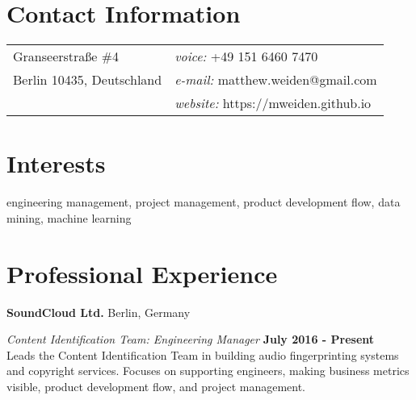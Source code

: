 \documentclass[margin,line]{res}
\newenvironment{list1}{
  \begin{list}{\ding{113}}{%
      \setlength{\itemsep}{0in}
      \setlength{\parsep}{0in} \setlength{\parskip}{0in}
      \setlength{\topsep}{0in} \setlength{\partopsep}{0in}
      \setlength{\leftmargin}{0.17in}}}{\end{list}}
\begin{document}

\begin{resume}
\section{\sc Contact Information}
\vspace{.05in}
\begin{tabular}{@{}p{2in}p{4in}}
Granseerstra{\ss}e \#4             & {\it voice:}  +49 151 6460 7470 \\
Berlin 10435, Deutschland & {\it e-mail:}  matthew.weiden@gmail.com\\
  & {\it website:} https://mweiden.github.io
\end{tabular}

\section{\sc Interests}
engineering management, project management, product development flow, data mining, machine learning

\section{\sc Professional Experience}
{\bf SoundCloud Ltd.} Berlin, Germany\\
\vspace*{-.1in}
\begin{list1}
\item[] {\em Content Identification Team: Engineering Manager} \hfill {\bf July 2016 - Present}\\
Leads the Content Identification Team in building audio fingerprinting systems and copyright services. Focuses on supporting engineers, making business metrics visible, product development flow, and project management.


\end{list1}
\end{resume}
\end{document}
